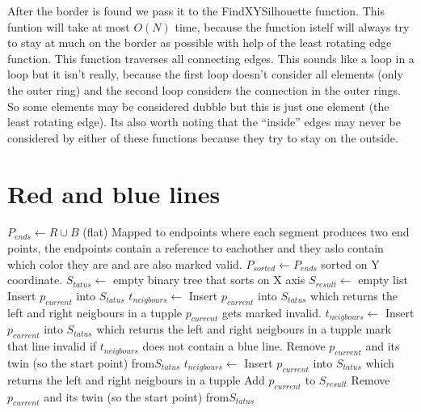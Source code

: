 \documentclass{article}
\begin{document}
After the border is found we pass it to the FindXYSilhouette function.
This funtion will take at most $O(N)$ time, because the function
istelf will always try to stay at much on the border as possible with help
of the least rotating edge function. This function traverses all connecting
edges. This sounds like a loop in a loop but it isn't really, because the
first loop doesn't consider all elements (only the outer ring) and the second
loop considers the connection in the outer rings. So some elements may be
considered dubble but this is just one element (the least rotating edge).
Its also worth noting that the ``inside'' edges may never be considered by
either of these functions because they try to stay on the outside.
\section{Red and blue lines}
\begin{algorithmic}[1]
	\State
	$P_{ends} \gets R \cup B$ (flat) Mapped to endpoints where each segment
	produces two end points, the endpoints contain a reference to eachother
	and they aslo contain which color they are and are also marked
	valid.
	\State
	$P_{sorted} \gets P_{ends}$ sorted on Y coordinate.
	\State
	$S_{tatus} \gets $ empty binary tree that sorts on X axis
	$S_{result} \gets $ empty list
			Insert $p_{current}$ into $S_{tatus}$
		\State
			\State
			$t_{neigbours} \gets $ Insert $p_{current}$ into
			$S_{tatus}$ which returns the left and right neigbours
			in a tupple
				\State
				$p_{current}$ gets marked invalid.
			\EndIf
		\State
			\State
			$t_{neigbours} \gets $ Insert $p_{current}$ into
			$S_{tatus}$ which returns the left and right neigbours
			in a tupple
				\State
				mark that line invalid if $t_{neigbours}$ does
				not contain a blue line.
			\EndIf
			\State
			Remove $p_{current}$ and its twin (so the start point) from$S_{tatus}$
		\State
			\State
			$t_{neigbours} \gets $ Insert $p_{current}$ into
			$S_{tatus}$ which returns the left and right neigbours
			in a tupple
				Add $p_{current}$ to $S_{result}$
			\EndIf
			\State
			Remove $p_{current}$ and its twin (so the start point) from$S_{tatus}$
		\EndIf
	\EndFor
\end{algorithmic}
\end{document}
